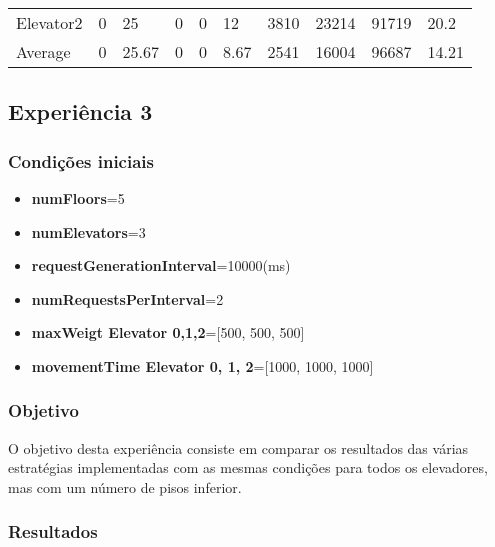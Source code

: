 ﻿\documentclass[a4paper]{article}
\begin{document}
\begin{table}[h]
\begin{tabular}{@{}llllllllll@{}}
Elevator2 & 0        & 25            & 0           & 0                                                               & 12                                                                  & 3810                                                         & 23214                                                 & 91719                                                   & 20.2         \\
Average   & 0     & 25.67         & 0        & 0                                                               & 8.67                                                              & 2541                                                         & 16004                                                 &  96687                                                  & 14.21        \\ \bottomrule
\end{tabular}
\end{table}

\subsection{Experiência 3}

\subsubsection{Condições iniciais}

\begin{itemize}
\item \textbf{numFloors}=5
\item \textbf{numElevators}=3
\item \textbf{requestGenerationInterval}=10000(ms)
\item \textbf{numRequestsPerInterval}=2
\item \textbf{maxWeigt Elevator 0,1,2}=[500, 500, 500]
\item \textbf{movementTime Elevator 0, 1, 2}=[1000, 1000, 1000]
\end{itemize}

\subsubsection{Objetivo} 

O objetivo desta experiência consiste em comparar os resultados das várias estratégias implementadas com as mesmas condições para todos os elevadores, mas com um número de pisos inferior.

\subsubsection{Resultados}
\end{document}

